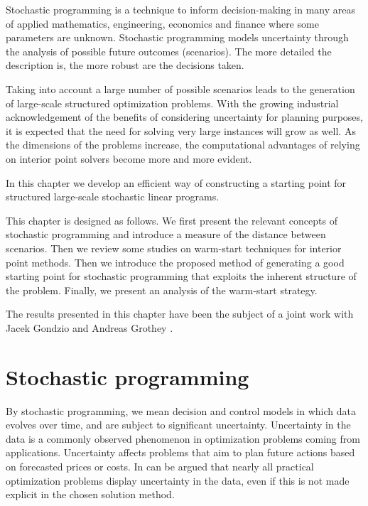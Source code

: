 
%
%
\label{ch:Warmstart}

Stochastic programming \cite{BirgeLouveaux,KallWallace}
is a technique to inform decision-making 
in many areas of applied mathematics, engineering, economics and 
finance where some parameters are unknown.
%
Stochastic programming models uncertainty through the analysis 
of possible future outcomes (scenarios). The more detailed the 
description is, the more robust are the decisions taken. 

Taking into account a large number of possible scenarios leads
to the generation of large-scale structured optimization problems.
With the growing industrial acknowledgement of the benefits of 
considering uncertainty for planning purposes, it is expected that the 
need for solving very large instances will grow as well.
As the dimensions of the problems increase, the computational advantages 
of relying on interior point solvers become more and more evident. 

In this chapter we develop an efficient way of constructing a 
starting point for structured large-scale stochastic linear programs.

This chapter is designed as follows. We first present the relevant
concepts of stochastic programming and introduce a measure of
the distance between scenarios. Then we review some studies on 
warm-start techniques for interior point methods. Then we introduce 
the proposed method of generating a good starting point for 
stochastic programming that exploits the inherent structure of the
problem. Finally, we present an analysis of the warm-start strategy.

The results presented in this chapter have been the subject
of a joint work with Jacek Gondzio and Andreas Grothey
\cite{ColomboGondzioGrothey06}. 

%
%
\section{Stochastic programming}

By stochastic programming, we mean decision and control models in which 
data evolves over time, and are subject to significant uncertainty.
%
Uncertainty in the data is a commonly observed phenomenon in
optimization problems coming from applications. Uncertainty
affects problems that aim to plan future actions based on forecasted
prices or costs. In can be argued that nearly all practical
optimization problems display uncertainty in the data, even if this is
not made explicit in the chosen solution method. 

